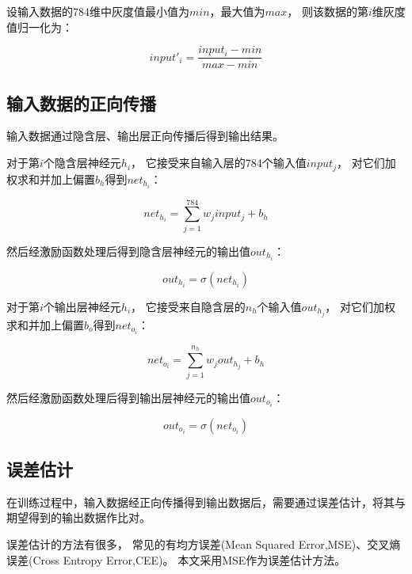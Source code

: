 \documentclass[forprint]{WHUBachelor}
\begin{document}
      设输入数据的784维中灰度值最小值为$min$，最大值为$max$，
      则该数据的第$i$维灰度值归一化为：

      \begin{equation}
        input'_{i}=\frac{input_{i}-min}{max-min}
      \end{equation}

    \subsection{输入数据的正向传播}

      输入数据通过隐含层、输出层正向传播后得到输出结果。

      对于第$i$个隐含层神经元$h_i$，
      它接受来自输入层的784个输入值$input_j$，
      对它们加权求和并加上偏置$b_h$得到$net_{h_i}$：

      \begin{equation}
        net_{h_i}=\sum_{j=1}^{784}{w_jinput_j}+b_h
      \end{equation}

      然后经激励函数处理后得到隐含层神经元的输出值$out_{h_i}$：

      \begin{equation}
        out_{h_i}=\sigma(net_{h_i})
      \end{equation}

      对于第$i$个输出层神经元$h_i$，
      它接受来自隐含层的$n_h$个输入值$out_{h_j}$，
      对它们加权求和并加上偏置$b_o$得到$net_{o_i}$：

      \begin{equation}
        net_{o_i}=\sum_{j=1}^{n_h}{w_jout_{h_j}}+b_h
      \end{equation}

      然后经激励函数处理后得到输出层神经元的输出值$out_{o_i}$：

      \begin{equation}
        out_{o_i}=\sigma(net_{o_i})
      \end{equation}

    \subsection{误差估计}
    
    在训练过程中，输入数据经正向传播得到输出数据后，需要通过误差估计，将其与期望得到的输出数据作比对。

    误差估计的方法有很多，
    常见的有均方误差(Mean Squared Error,MSE)、交叉熵误差(Cross Entropy Error,CEE)。
    本文采用MSE作为误差估计方法。
\end{document}
